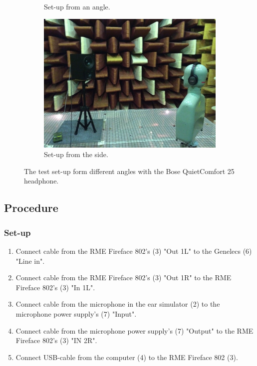 \begin{figure}[H]
\begin{subfigure}[b]{0.4\textwidth}
		\caption{Set-up from an angle.}
		\vspace{2ex}
		\includegraphics[width=\textwidth]{../Journal/Experiments/TestofConsumerHeadphones/Pictures/OtherBrandsSetupSide.jpg}
		\caption{Set-up from the side.}
	\end{subfigure}
	\caption{The test set-up form different angles with the Bose QuietComfort 25 headphone.}
\label{fig:OtherBrandsPicture}
\end{figure}


\subsection{Procedure}
	\subsubsection{Set-up}
	\begin{enumerate}
		\item Connect cable from the RME Fireface 802's (3) "Out 1L" to the Genelecs (6) "Line in".
		\item Connect cable from the RME Fireface 802's (3) "Out 1R" to the RME Fireface 802's (3) "In 1L".
		\item Connect cable from the microphone in the ear simulator (2) to the microphone power supply's (7) "Input".
		\item Connect cable from the microphone power supply's (7) "Output" to the RME Fireface 802's (3) "IN 2R".
		\item Connect USB-cable from the computer (4) to the RME Fireface 802 (3).
	\end{enumerate}

